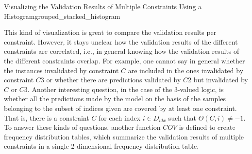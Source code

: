 \begin{Bsp}{Visualizing the Validation Results of Multiple Constraints Using a Histogram}{grouped_stacked_histogram}
\begin{minipage}[t]{\linewidth}
            \label{fig:class_per_constraints_samples_plot}
        \end{minipage}
\end{Bsp}

This kind of visualization is great to compare the validation results per constraint. However, it stays unclear how the validation results of the different constraints are correlated, i.e., in general knowing how the validation results of the different constraints overlap. For example, one cannot say in general whether the instances invalidated by constraint $C$ are included in the ones invalidated by constraint $C3$ or whether there are predictions validated by $C2$ but invalidated by $C$ or $C3$. Another interesting question, in the case of the 3-valued logic, is whether all the predictions made by the model on the basis of the samples belonging to the subset of indices given are covered by at least one constraint. That is, there is a constraint $C$ for each index $i \in D_{idx}$ such that $\Theta(C,i) \neq -1$. To answer these kinds of questions, another function $COV$ is defined to create frequency distribution tables, which summarize the validation results of multiple constraints in a single 2-dimensional frequency distribution table.

